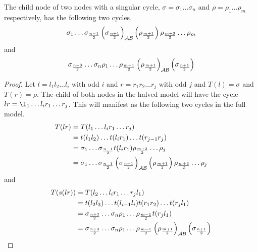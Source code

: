 \begin{theorem}
	The child node of two nodes with a singular cycle, $\sigma = \sigma_1 \dots \sigma_n$ and $\rho = \rho_1 \dots \rho_m$ respectively, has the following two cycles.
	\begin{align*}
		\sigma_1 \dots \sigma_{\frac{n-1}{2}} \left(\sigma_{\frac{n+1}{2}}\right)_{\mathcal{A}\mathcal{B}}
		\left(\rho_{\frac{m+1}{2}}\right) \rho_{\frac{m+3}{2}} \dots \rho_m
	\end{align*}
	and
	\begin{align*}
		\sigma_{\frac{n+3}{2}} \dots \sigma_n \rho_1 \dots \rho_{\frac{m-1}{2}}
		\left(\rho_{\frac{m+1}{2}}\right)_{\mathcal{A}\mathcal{B}} \left(\sigma_{\frac{n+1}{2}}\right)
	\end{align*}
\end{theorem}

\begin{proof}
	Let $l = l_1l_2 \dots l_i$ with odd $i$ and $r = r_1r_2 \dots r_j$ with odd $j$ and $T(l) = \sigma$ and $T(r) = \rho$.
	The child of both nodes in the halved model will have the cycle $lr = \l_1 \dots l_i r_1 \dots r_j$.
	This will manifest as the following two cycles in the full model.
	\begin{align*}
		T(lr) & = T(l_1 \dots l_i r_1 \dots r_j)                                                    \\
		      & = t(l_1l_2) \dots t(l_ir_1) \dots t(r_{j-1}r_j)                                     \\
		      & = \sigma_1 \dots \sigma_{\frac{n-1}{2}} t(l_ir_1) \rho_{\frac{m+3}{2}} \dots \rho_j \\
		      & = \sigma_1 \dots \sigma_{\frac{n-1}{2}} \left(\sigma_{\frac{n+1}{2}}\right)_{\mathcal{A}\mathcal{B}}
		\left(\rho_{\frac{m+1}{2}}\right) \rho_{\frac{m+3}{2}} \dots \rho_j
	\end{align*}
	and
	\begin{align*}
		T(s(lr)) & = T(l_2 \dots l_i r_1 \dots r_j l_1)                                                \\
		         & = t(l_2l_3) \dots t(l_{i-1}l_i) t(r_1r_2) \dots t(r_jl_1)                           \\
		         & = \sigma_{\frac{n+3}{2}} \dots \sigma_n \rho_1 \dots \rho_{\frac{m-1}{2}} t(r_jl_1) \\
		         & = \sigma_{\frac{n+3}{2}} \dots \sigma_n \rho_1 \dots \rho_{\frac{m-1}{2}}
		\left(\rho_{\frac{m+1}{2}}\right)_{\mathcal{A}\mathcal{B}} \left(\sigma_{\frac{n+1}{2}}\right)
	\end{align*}
\end{proof}

